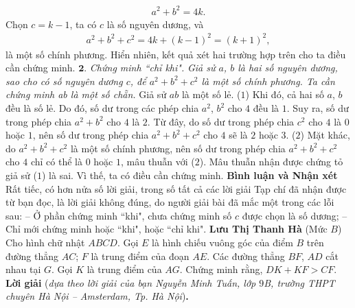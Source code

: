 \begin{multicols}{2}
\begin{align*}
		{a^2} + {b^2} = 4k.
	\end{align*}
	Chọn $c = k - 1$, ta có $c$ là số nguyên dương, và
	\begin{align*}
		{a^2} + {b^2} + {c^2} = 4k + {\left( {k - 1} \right)^2} = {\left( {k + 1} \right)^2},
	\end{align*}
	là một số chính phương.
	\vskip 0.05cm
	Hiển nhiên, kết quả xét hai trường hợp trên cho ta điều cần chứng minh.
	\vskip 0.05cm
	$\pmb{2.}$ \textit{Chứng minh ``chỉ khi".}
	\vskip 0.05cm
	\textit{Giả sử $a$, $b$ là hai số nguyên dương, sao cho có số nguyên dương $c$, để $a^2 + b^2 + c^2$  là một số chính phương. Ta cần chứng minh ab là một số chẵn.}
	\vskip 0.05cm
	Giả sử $ab$ là một số lẻ. \hfill ($1$)
	\vskip 0.05cm
	Khi đó, cả hai số $a$, $b$ đều là số lẻ. Do đó, số dư trong các phép chia  $a^2$, $b^2$ cho $4$ đều là $1$. Suy ra, số dư trong phép chia $a^2 + b^2$  cho $4$ là $2$. Từ đây, do số dư trong phép chia $c^2$ cho $4$ là $0$ hoặc $1$, nên số dư trong phép chia $a^2 + b^2 + c^2$  cho $4$ sẽ là $2$ hoặc $3$. \hfill ($2$)
	\vskip 0.05cm
	Mặt khác, do $a^2 + b^2 + c^2$ là một số chính phương, nên số dư trong phép chia  $a^2 + b^2 + c^2$ cho $4$ chỉ có thể là $0$ hoặc $1$, mâu thuẫn \linebreak với ($2$).
	\vskip 0.05cm
	Mâu thuẫn nhận được chứng tỏ giả sử ($1$) là sai. Vì thế, ta có điều cần chứng minh.
	\vskip 0.05cm
	\textbf{\color{thachthuctoanhoc}Bình luận và Nhận xét}
	\vskip 0.05cm
	Rất tiếc, có hơn nửa số lời giải, trong số tất cả các lời giải Tạp chí đã nhận được từ bạn đọc, là lời giải không đúng, do người giải bài đã mắc một trong các lỗi sau:
	\vskip 0.05cm
	-- Ở phần chứng minh ``khi", chưa chứng minh số $c$ được chọn là số dương;
	\vskip 0.05cm
	-- Chỉ mới chứng minh hoặc ``khi", hoặc ``chỉ khi".
	\vskip 0.1cm
		\hfill\textbf{\color{thachthuctoanhoc}Lưu Thị Thanh Hà}
	\vskip 0.1cm
	{}
	(Mức $B$)
	Cho hình chữ nhật $ABCD$. Gọi $E$ là hình chiếu vuông góc của điểm $B$ trên đường thẳng $AC$; $F$ là trung điểm của đoạn $AE$. Các đường thẳng $BF$, $AD$ cắt nhau tại $G$. Gọi $K$ là trung điểm của $AG$. Chứng minh rằng, $DK + KF > CF$.
	\vskip 0.05cm
	\textbf{\color{thachthuctoanhoc}Lời giải} (\textit{dựa theo lời giải của bạn Nguyễn Minh Tuấn, lớp $9$B, trường THPT chuyên Hà Nội -- Amsterdam, Tp. Hà Nội})\textbf{\color{thachthuctoanhoc}.}
	\begin{figure}[H]
		\vspace*{-10pt}
		\centering
		\captionsetup{labelformat= empty, justification=centering}

\end{figure}
\end{multicols}
